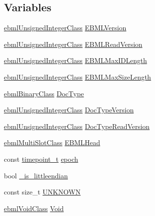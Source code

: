 \subsection*{Variables}
\begin{DoxyCompactItemize}
\item 
\mbox{\hyperlink{namespaceebml_a506b246c5594e5d0322c3c05e9820fd2}{ebml\+Unsigned\+Integer\+Class}} \mbox{\hyperlink{namespaceebml_ab043f0427daa3a4eb36615002a603c2f}{E\+B\+M\+L\+Version}}
\item 
\mbox{\hyperlink{namespaceebml_a506b246c5594e5d0322c3c05e9820fd2}{ebml\+Unsigned\+Integer\+Class}} \mbox{\hyperlink{namespaceebml_ae2a831962d9fe406ade51a61f4d7f44f}{E\+B\+M\+L\+Read\+Version}}
\item 
\mbox{\hyperlink{namespaceebml_a506b246c5594e5d0322c3c05e9820fd2}{ebml\+Unsigned\+Integer\+Class}} \mbox{\hyperlink{namespaceebml_aa5391f5da29eee93d9bbb4faef121430}{E\+B\+M\+L\+Max\+I\+D\+Length}}
\item 
\mbox{\hyperlink{namespaceebml_a506b246c5594e5d0322c3c05e9820fd2}{ebml\+Unsigned\+Integer\+Class}} \mbox{\hyperlink{namespaceebml_a2f4a3ca0aa5867e5024d72b48328ee65}{E\+B\+M\+L\+Max\+Size\+Length}}
\item 
\mbox{\hyperlink{namespaceebml_a4fe139b904ac34f0e3036c9451b4b18b}{ebml\+Binary\+Class}} \mbox{\hyperlink{namespaceebml_ad196ce572692673a986be2bdabf9907b}{Doc\+Type}}
\item 
\mbox{\hyperlink{namespaceebml_a506b246c5594e5d0322c3c05e9820fd2}{ebml\+Unsigned\+Integer\+Class}} \mbox{\hyperlink{namespaceebml_a4bfea9b659c99c0f0d0dc51026f480ca}{Doc\+Type\+Version}}
\item 
\mbox{\hyperlink{namespaceebml_a506b246c5594e5d0322c3c05e9820fd2}{ebml\+Unsigned\+Integer\+Class}} \mbox{\hyperlink{namespaceebml_acd5324e76213e2721983c93bd909eeff}{Doc\+Type\+Read\+Version}}
\item 
\mbox{\hyperlink{classebml_1_1ebmlMultiSlotClass}{ebml\+Multi\+Slot\+Class}} \mbox{\hyperlink{namespaceebml_a969dbd2316937386e704f1aae53ed8b9}{E\+B\+M\+L\+Head}}
\item 
const \mbox{\hyperlink{namespaceebml_a7e667ec3fe8b51fb5b8f9690734d8638}{timepoint\+\_\+t}} \mbox{\hyperlink{namespaceebml_a137fb22cbfb98d4e7bd6367064078bee}{epoch}}
\item 
bool \mbox{\hyperlink{namespaceebml_a3dca826d4a08dfedbd01e9aa1c09bc1e}{\+\_\+is\+\_\+littleendian}}
\item 
const size\+\_\+t \mbox{\hyperlink{namespaceebml_afdd26b7d8e8274b92f571969a325e52e}{U\+N\+K\+N\+O\+WN}}
\item 
\mbox{\hyperlink{classebml_1_1ebmlVoidClass}{ebml\+Void\+Class}} \mbox{\hyperlink{namespaceebml_afbfd509d1cb71e416a07253746e886e9}{Void}}
\end{DoxyCompactItemize}


